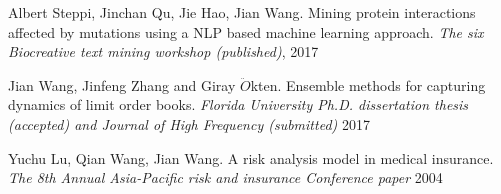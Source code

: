 \begin{cventries}
  \cventry
    {}
    {}
    {}
    {}
    {
      \begin{cvitems}
        \item {Albert Steppi, Jinchan Qu, Jie Hao, Jian Wang. Mining protein interactions affected by mutations using a NLP based
        machine learning approach. \textit{The six Biocreative text mining workshop (published)}, 2017}
        \item {Jian Wang, Jinfeng Zhang and Giray $\ddot{O}$kten. Ensemble methods for capturing dynamics of limit order books. \textit{Florida
        University Ph.D. dissertation thesis (accepted) and Journal of High Frequency (submitted)} 2017}
        \item {Yuchu Lu, Qian Wang, Jian Wang. A risk analysis model in medical insurance. \textit{The 8th Annual Asia-Pacific risk and
        insurance Conference paper} 2004}
      \end{cvitems}
    }
\end{cventries}